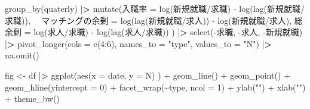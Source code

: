 \documentclass[
]{book}
\newenvironment{Shaded}{\begin{snugshade}}{\end{snugshade}}
\newcommand{\AttributeTok}[1]{\textcolor[rgb]{0.77,0.63,0.00}{#1}}
\newcommand{\DecValTok}[1]{\textcolor[rgb]{0.00,0.00,0.81}{#1}}
\newcommand{\ErrorTok}[1]{\textcolor[rgb]{0.64,0.00,0.00}{\textbf{#1}}}
\newcommand{\FunctionTok}[1]{\textcolor[rgb]{0.00,0.00,0.00}{#1}}
\newcommand{\NormalTok}[1]{#1}
\newcommand{\OtherTok}[1]{\textcolor[rgb]{0.56,0.35,0.01}{#1}}
\newcommand{\SpecialCharTok}[1]{\textcolor[rgb]{0.00,0.00,0.00}{#1}}
\newcommand{\StringTok}[1]{\textcolor[rgb]{0.31,0.60,0.02}{#1}}
\begin{document}
\begin{Shaded}
\begin{Highlighting}[]
  \FunctionTok{group\_by}\NormalTok{(quaterly) }\SpecialCharTok{|}\ErrorTok{\textgreater{}} 
  \FunctionTok{mutate}\NormalTok{(入職率 }\OtherTok{=} \FunctionTok{log}\NormalTok{(新規就職}\SpecialCharTok{/}\NormalTok{求職) }\SpecialCharTok{{-}} \FunctionTok{log}\NormalTok{(}\FunctionTok{lag}\NormalTok{(新規就職}\SpecialCharTok{/}\NormalTok{求職)),}
\NormalTok{        　マッチングの余剰 }\OtherTok{=} \FunctionTok{log}\NormalTok{(}\FunctionTok{lag}\NormalTok{(新規就職}\SpecialCharTok{/}\NormalTok{求人)) }\SpecialCharTok{{-}} \FunctionTok{log}\NormalTok{(新規就職}\SpecialCharTok{/}\NormalTok{求人),}
\NormalTok{           総余剰 }\OtherTok{=} \FunctionTok{log}\NormalTok{(求人}\SpecialCharTok{/}\NormalTok{求職) }\SpecialCharTok{{-}} \FunctionTok{log}\NormalTok{(}\FunctionTok{lag}\NormalTok{(求人}\SpecialCharTok{/}\NormalTok{求職))}
\NormalTok{           ) }\SpecialCharTok{|}\ErrorTok{\textgreater{}} 
  \FunctionTok{select}\NormalTok{(}\SpecialCharTok{{-}}\NormalTok{求職,}
         \SpecialCharTok{{-}}\NormalTok{求人,}
         \SpecialCharTok{{-}}\NormalTok{新規就職) }\SpecialCharTok{|}\ErrorTok{\textgreater{}} 
  \FunctionTok{pivot\_longer}\NormalTok{(}\AttributeTok{cols =} \FunctionTok{c}\NormalTok{(}\DecValTok{4}\SpecialCharTok{:}\DecValTok{6}\NormalTok{),}
               \AttributeTok{names\_to =} \StringTok{"type"}\NormalTok{,}
               \AttributeTok{values\_to =} \StringTok{"N"}\NormalTok{) }\SpecialCharTok{|}\ErrorTok{\textgreater{}} 
  \FunctionTok{na.omit}\NormalTok{()}

\NormalTok{fig }\OtherTok{\textless{}{-}}
\NormalTok{  df }\SpecialCharTok{|}\ErrorTok{\textgreater{}} 
  \FunctionTok{ggplot}\NormalTok{(}\FunctionTok{aes}\NormalTok{(}\AttributeTok{x =}\NormalTok{ date,}
             \AttributeTok{y =}\NormalTok{ N)}
\NormalTok{         ) }\SpecialCharTok{+}
  \FunctionTok{geom\_line}\NormalTok{() }\SpecialCharTok{+}
  \FunctionTok{geom\_point}\NormalTok{() }\SpecialCharTok{+}
  \FunctionTok{geom\_hline}\NormalTok{(}\AttributeTok{yintercept =} \DecValTok{0}\NormalTok{) }\SpecialCharTok{+}
  \FunctionTok{facet\_wrap}\NormalTok{(}\SpecialCharTok{\textasciitilde{}}\NormalTok{type,}
             \AttributeTok{ncol =} \DecValTok{1}\NormalTok{) }\SpecialCharTok{+}
  \FunctionTok{ylab}\NormalTok{(}\StringTok{""}\NormalTok{) }\SpecialCharTok{+}
  \FunctionTok{xlab}\NormalTok{(}\StringTok{""}\NormalTok{) }\SpecialCharTok{+}
  \FunctionTok{theme\_bw}\NormalTok{()}
\end{Highlighting}
\end{Shaded}
\end{document}
